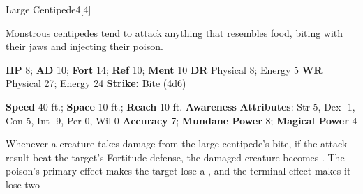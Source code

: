   \begin{monsection}{Large Centipede}{4}[4]
    \vspace{-1em}\vspace{-1em}
    \vspace{0em}

    
    Monstrous centipedes tend to attack anything that resembles food, biting with their jaws and injecting their poison.
  

    \begin{spellcontent}
      \begin{spelltargetinginfo}
        \pari \textbf{HP} 8;
          \textbf{AD} 10;
          \textbf{Fort} 14;
          \textbf{Ref} 10;
          \textbf{Ment} 10
        \pari \textbf{DR} Physical 8; Energy 5
        \pari \textbf{WR} Physical 27; Energy 24
        \pari \textbf{Strike:}
            Bite  (4d6)
      \end{spelltargetinginfo}
    \end{spellcontent}
    \begin{monsterfooter}
      \pari \textbf{Speed} 40 ft.;
        \textbf{Space} 10 ft.;
        \textbf{Reach} 10 ft.
      \pari \textbf{Awareness} 
      \pari \textbf{Attributes}:
        Str 5, Dex -1,
        Con 5, Int -9,
        Per 0, Wil 0
      \pari \textbf{Accuracy} 7;
        \textbf{Mundane Power} 8;
      \textbf{Magical Power} 4
    \end{monsterfooter}
  \end{monsection}
    Whenever a creature takes damage from the large centipede's bite,
      if the attack result beat the target's Fortitude defense,
      the damaged creature becomes .
    The poison's primary effect makes the target lose a , and the terminal effect makes it lose two 
  
